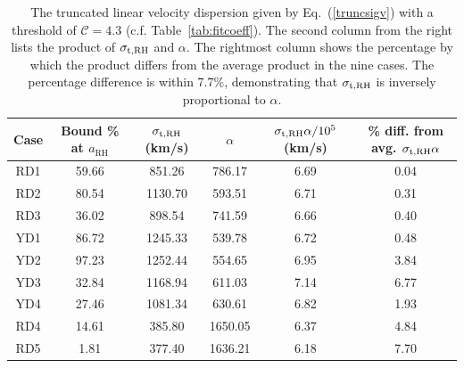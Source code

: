 \documentclass[a4paper,11pt]{article}
\newcommand{\rh}[1]{{#1}_{\mathrm{RH}}}
\begin{document}
\begin{table}[]
\begin{tabular}{|c|c|c|c|c|c|}
\hline
Case & Bound \% at $\rh{a}$ & $\sigma_{\rm t,RH}$ (km/s) & $\alpha$ & $\sigma_{\rm t,RH} \alpha / 10^5$ (km/s) & \shortstack[c]{\% diff. from \\ avg. $\sigma_{\rm t,RH}\alpha$} \\ \hline \hline
RD1  & 59.66      & 851.26                     & 786.17                & 6.69                       & 0.04                                      \\ 
RD2  & 80.54      & 1130.70                    & 593.51                & 6.71                       & 0.31                                      \\ 
RD3  & 36.02      & 898.54                     & 741.59                & 6.66                       & 0.40                                      \\ 
YD1  & 86.72      & 1245.33                    & 539.78                & 6.72                       & 0.48                                      \\ 
YD2  & 97.23      & 1252.44                    & 554.65                & 6.95                       & 3.84                                      \\ 
YD3  & 32.84      & 1168.94                    & 611.03                & 7.14                       & 6.77                                      \\ 
YD4  & 27.46      & 1081.34                    & 630.61                & 6.82                       & 1.93                                      \\ 
RD4  & 14.61      & 385.80                     & 1650.05               & 6.37                       & 4.84                                      \\ 
RD5  & 1.81       & 377.40                     & 1636.21               & 6.18                       & 7.70                                      \\ \hline
\end{tabular}
\caption{The truncated linear velocity dispersion given by Eq.~(\ref{truncsigv}) with a threshold of $\mathcal{C} = 4.3$ (c.f. Table~\ref{tab:fitcoeff}). The second column from the right lists the product of $\sigma_{\rm t,RH}$ and $\alpha$. The rightmost column shows the percentage by which the product differs from the average product in the nine cases. The percentage difference is within 7.7\%, demonstrating that $\sigma_{\rm t,RH}$ is inversely proportional to $\alpha$. }
\label{tab:truncsig}
\end{table}
\end{document}
